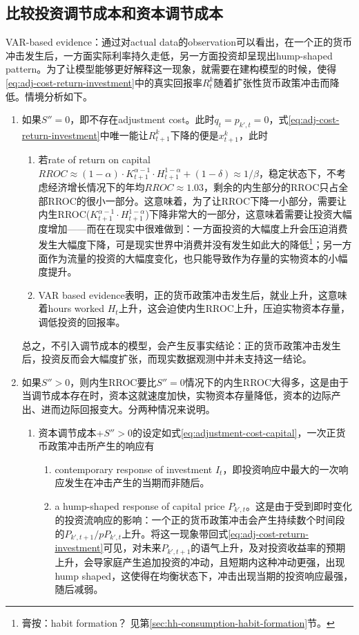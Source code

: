 \subsection{比较投资调节成本和资本调节成本}
\label{sec:adj-cost-comp-inv}
VAR-based evidence：通过对actual data的observation可以看出，在一个正的货币冲击发生后，一方面实际利率持久走低，另一方面投资却呈现出hump-shaped pattern。为了让模型能够更好解释这一现象，就需要在建构模型的时候，使得\eqref{eq:adj-cost-return-investment}中的真实回报率$R^k_{t}$随着扩张性货币政策冲击而降低。情境分析如下。
\begin{enumerate}
\item 如果$S''=0$，即不存在adjustment cost。此时$q_t = p_{k',t}=0$，式\eqref{eq:adj-cost-return-investment}中唯一能让$R^k_{t+1}$下降的便是$x^k_{t+1}$，此时
\begin{enumerate}
\item 若rate of return on capital $RROC \approx (1-\alpha) \cdot K_{t+1}^{\alpha-1} \cdot H_{t+1}^{1-\alpha} + (1-\delta) \approx 1/\beta$，稳定状态下，不考虑经济增长情况下的年均$RROC \approx 1.03$，剩余的内生部分的RROC只占全部RROC的很小一部分。这意味着，为了让RROC下降一小部分，需要让内生RROC($K_{t+1}^{\alpha-1} \cdot H_{t+1}^{1-\alpha}$)下降非常大的一部分，这意味着需要让投资大幅度增加——而在在现实中很难做到：一方面投资的大幅度上升会压迫消费发生大幅度下降，可是现实世界中消费并没有发生如此大的降低\footnote{膏按：habit formation？ 见第\ref{sec:hh-consumption-habit-formation}节。}；另一方面作为流量的投资的大幅度变化，也只能导致作为存量的实物资本的小幅度提升。
\item VAR based evidence表明，正的货币政策冲击发生后，就业上升，这意味着hours worked $H_t$上升，这会迫使内生RROC上升，压迫实物资本存量，调低投资的回报率。
\end{enumerate}

总之，不引入调节成本的模型，会产生反事实结论：正的货币政策冲击发生后，投资反而会大幅度扩张，而现实数据观测中并未支持这一结论。
\item 如果$S'' >0$，则内生RROC要比$S''=0$情况下的内生RROC大得多，这是由于当调节成本存在时，资本这就速度加快，实物资本存量降低，资本的边际产出、进而边际回报变大。分两种情况来说明。
\begin{enumerate}
\item 资本调节成本+$S'' >0$的设定如式\eqref{eq:adjustment-cost-capital}，一次正货币政策冲击所产生的响应有
\begin{enumerate}
\item contemporary response of investment $I_t$，即投资响应中最大的一次响应发生在冲击产生的当期而非随后。
\item a hump-shaped response of capital price $P_{k',t}$。这是由于受到即时变化的投资流响应的影响：一个正的货币政策冲击会产生持续数个时间段的$P_{k',t+1}/pP_{k',t}$上升。将这一现象带回式\eqref{eq:adj-cost-return-investment}可见，对未来$P_{k',t+1}$的语气上升，及对投资收益率的预期上升，会导家庭产生追加投资的冲动，且短期内这种冲动更强，出现hump shaped，这使得在均衡状态下，冲击出现当期的投资响应最强，随后减弱。
\end{enumerate}


\end{enumerate}
\end{enumerate}

